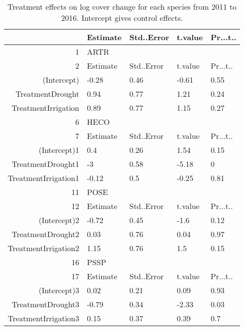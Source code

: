 \begin{table}[ht]
\centering
\caption{Treatment effects on log cover change for each species from 2011 to 2016. Intercept gives control effects.} 
\label{table:coverChange}
\begin{tabular}{rllll}
  \hline
 & Estimate & Std..Error & t.value & Pr...t.. \\ 
  \hline
1 & ARTR &  &  &  \\ 
  2 & Estimate & Std..Error & t.value & Pr...t.. \\ 
  (Intercept) & -0.28 & 0.46 & -0.61 & 0.55 \\ 
  TreatmentDrought & 0.94 & 0.77 & 1.21 & 0.24 \\ 
  TreatmentIrrigation & 0.89 & 0.77 & 1.15 & 0.27 \\ 
  6 & HECO &  &  &  \\ 
  7 & Estimate & Std..Error & t.value & Pr...t.. \\ 
  (Intercept)1 & 0.4 & 0.26 & 1.54 & 0.15 \\ 
  TreatmentDrought1 & -3 & 0.58 & -5.18 & 0 \\ 
  TreatmentIrrigation1 & -0.12 & 0.5 & -0.25 & 0.81 \\ 
  11 & POSE &  &  &  \\ 
  12 & Estimate & Std..Error & t.value & Pr...t.. \\ 
  (Intercept)2 & -0.72 & 0.45 & -1.6 & 0.12 \\ 
  TreatmentDrought2 & 0.03 & 0.76 & 0.04 & 0.97 \\ 
  TreatmentIrrigation2 & 1.15 & 0.76 & 1.5 & 0.15 \\ 
  16 & PSSP &  &  &  \\ 
  17 & Estimate & Std..Error & t.value & Pr...t.. \\ 
  (Intercept)3 & 0.02 & 0.21 & 0.09 & 0.93 \\ 
  TreatmentDrought3 & -0.79 & 0.34 & -2.33 & 0.03 \\ 
  TreatmentIrrigation3 & 0.15 & 0.37 & 0.39 & 0.7 \\ 
   \hline
\end{tabular}
\end{table}
